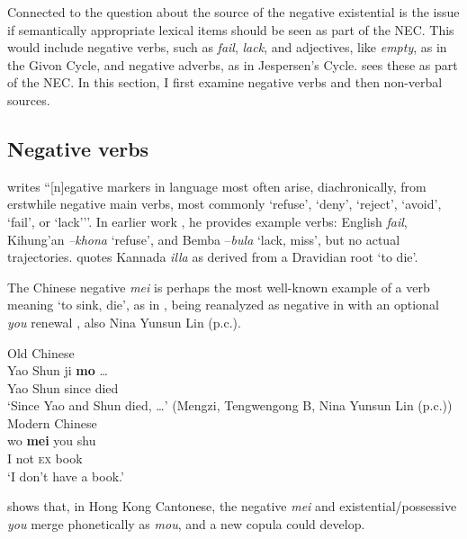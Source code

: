 \documentclass[output=paper,draft,draftmode,colorlinks,citecolor=brown]{langscibook}
\begin{document}
Connected to the question about the source of the negative existential is
the issue if semantically appropriate lexical items should be seen as part
of the NEC. This would include negative verbs, such as \textit{fail},
\textit{lack}, and adjectives, like \textit{empty}, as in the Givon Cycle,
and negative adverbs, as in Jespersen's Cycle.
\citet[136--7]{Veselinova2013} sees these as part of the NEC. In this
section, I first examine negative verbs and then non-verbal sources.

\subsection{Negative verbs}\label{sec:oth-3.1}

\citet[89]{Givon1978} writes ``[n]egative markers in language most often
arise, diachronically, from erstwhile negative main verbs, most commonly
`refuse', `deny', `reject', `avoid', `fail', or `lack{'}''. In earlier work
\citep[917]{Givon1973}, he provides example verbs: English \textit{fail},
Kihung'an \textit{–khona} `refuse', and Bemba –\textit{bula} `lack, miss',
but no actual trajectories. \citet{Veselinova2013} quotes Kannada
\textit{illa} as derived from a Dravidian root `to die'. 

The Chinese negative \textit{mei} is perhaps the most well-known example of
a verb meaning `to sink, die', as in , being
reanalyzed as negative in  with an optional
\textit{you} renewal
\parencites[11]{Croft1991}{ShiLi2004}{Yang2012}, also Nina Yunsun Lin (p.c.).
%
\begin{exe}\ex Old Chinese \label{ex:other-chinese-die}\\
    \gll Yao  Shun  ji  \textbf{mo}   \ldots{}          \\
  Yao   Shun   since   died \\
    \glt `Since Yao and Shun died, \ldots' (Mengzi, Tengwengong B, Nina Yunsun Lin (p.c.))
    \ex Modern Chinese \label{ex:other-chinese-book}\\
    \gll wo  \textbf{mei}  {\op}you{\cp}  shu            \\
  I  not  \textsc{ex}  book \\
    \glt `I don't have a book.'
    \end{exe}
%
\citet{LamChitYu2017} shows that, in Hong Kong Cantonese, the negative
\textit{mei} and existential\slash possessive \textit{you} merge
phonetically as \textit{mou}, and a new copula could develop.
\end{document}
